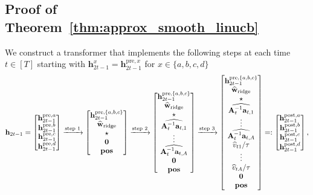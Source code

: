 \documentclass[10pt]{article}
\renewcommand{\hat}{\widehat}
\newcommand{\<}{\left\langle}
\renewcommand{\>}{\right\rangle}
\newcommand{\bzero}{{\mathbf 0}}
\newcommand{\ridge}{{\rm ridge}}
\newcommand{\pre}{{\mathrm{pre}}}
\newcommand{\posv}{{\mathbf{pos}}}
\newcommand{\post}{{\mathrm{post}}}
\newcommand{\parta}{{a}}
\newcommand{\partb}{{b}}
\newcommand{\partc}{{c}}
\newcommand{\partd}{{d}}
\newcommand{\temp}{{\tau}}
\def\bA{{\mathbf A}}
\def\ba{{\mathbf a}}
\def\bh{{\mathbf h}}
\def\bw{{\mathbf w}}
\begin{document}
\subsection{Proof of Theorem~\ref{thm:approx_smooth_linucb}}\label{sec:pf_thm:approx_smooth_linucb}
We construct a transformer that implements the following steps at each time $t\in[T]$ starting with $\bh^{x}_{2t-1}=\bh^{\pre,x}_{2t-1}$ for $x\in\{\parta,\partb,\partc,\partd\}$
\begin{align}
    \bh_{2t-1}=
    \begin{bmatrix}
    \bh_{2t-1}^{\pre,\parta} \\  \bh_{2t-1}^{\pre,\partb}\\  \bh_{2t-1}^{\pre,\partc}\\   \bh_{2t-1}^{\pre,\partd}
\end{bmatrix}
\xrightarrow{\text{step 1}}
   \begin{bmatrix}
    \bh_{2t-1}^{\pre,\{\parta,\partb,\partc\}} \\
        \hat\bw_{\ridge} \\ \star\\ \bzero \\\posv
\end{bmatrix}
\xrightarrow{\text{step 2}}
\begin{bmatrix}
    \bh_{2t-1}^{\pre,\{\parta,\partb,\partc\}} \\
        \hat\bw_{\ridge} \\ \star\\ \widehat{\bA_t^{-1}\ba_{t,1}}\\\vdots\\\widehat{\bA_t^{-1}\ba_{t,A}}
        \\ \bzero \\\posv
\end{bmatrix}
\xrightarrow{\text{step 3}}
\begin{bmatrix}
    \bh_{2t-1}^{\pre,\{\parta,\partb,\partc\}} \\
        \hat\bw_{\ridge} \\ \star\\ \widehat{\bA_t^{-1}\ba_{t,1}}\\\vdots\\\widehat{\bA_t^{-1}\ba_{t,A}}\\ {\hat v_{t1}}/{\temp}\\\vdots\\ {\hat v_{tA}}/{\temp}
        \\ \bzero \\\posv
\end{bmatrix}
=:
\begin{bmatrix}
    \bh_{2t-1}^{\post,\parta} \\  \bh_{2t-1}^{\post,\partb}\\  \bh_{2t-1}^{\post,\partc}\\   \bh_{2t-1}^{\post,\partd}
\end{bmatrix},\label{eq:slinucb_pipeline}
\end{align}
\end{document}
